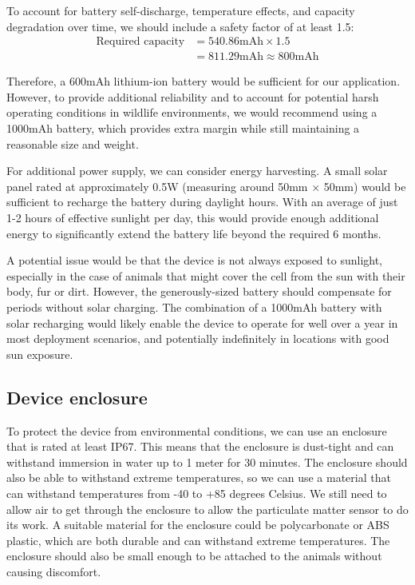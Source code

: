 To account for battery self-discharge, temperature effects, and capacity degradation over time, we should include a safety factor of at least 1.5:
\begin{align*}
\text{Required capacity} &= 540.86\text{mAh} \times 1.5 \\
&= 811.29\text{mAh} \approx 800\text{mAh}
\end{align*}

Therefore, a 600mAh lithium-ion battery would be sufficient for our application. However, to provide additional reliability and to account for potential harsh operating conditions in wildlife environments, we would recommend using a 1000mAh battery, which provides extra margin while still maintaining a reasonable size and weight. %

For additional power supply, we can consider energy harvesting. 
A small solar panel rated at approximately 0.5W (measuring around 50mm × 50mm) would be sufficient to recharge the battery during daylight hours. With an average of just 1-2 hours of effective sunlight per day, this would provide enough additional energy to significantly extend the battery life beyond the required 6 months. 

A potential issue would be that the device is not always exposed to sunlight, especially in the case of animals that might cover the cell from the sun with their body, fur or dirt. However, the generously-sized battery should compensate for periods without solar charging. The combination of a 1000mAh battery with solar recharging would likely enable the device to operate for well over a year in most deployment scenarios, and potentially indefinitely in locations with good sun exposure.

\subsection{Device enclosure}
To protect the device from environmental conditions, we can use an enclosure that is rated at least IP67. This means that the enclosure is dust-tight and can withstand immersion in water up to 1 meter for 30 minutes. The enclosure should also be able to withstand extreme temperatures, so we can use a material that can withstand temperatures from -40 to +85 degrees Celsius. We still need to allow air to get through the enclosure to allow the particulate matter sensor to do its work. A suitable material for the enclosure could be polycarbonate or ABS plastic, which are both durable and can withstand extreme temperatures. The enclosure should also be small enough to be attached to the animals without causing discomfort.

